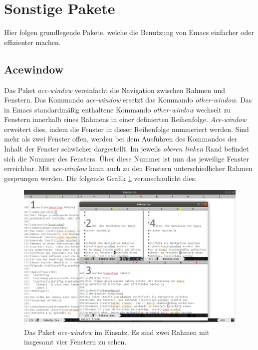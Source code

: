 \section{Sonstige Pakete}
\label{sec:misc}
Hier folgen grundlegende Pakete, welche die Benutzung von Emacs
einfacher oder effizienter machen.\\

\subsection{Acewindow}
\label{subsec:acewindow}
Das Paket \textit{ace-window} vereinfacht die Navigation zwischen
Rahmen und Fenstern. Das Kommando \textit{ace-window} ersetzt das
Kommando \textit{other-window}. Das in Emacs standardmäßig enthaltene
Kommando \textit{other-window} wechselt zu Fenstern innerhalb eines
Rahmens in einer definierten Reihenfolge. \textit{Ace-window}
erweitert dies, indem die Fenster in dieser Reihenfolge nummeriert
werden. Sind mehr als zwei Fenster offen, werden bei dem Ausführen des
Kommandos der Inhalt der Fenster {\glqq}schwächer{\grqq}
dargestellt. Im jeweils \textit{oberen linken} Rand befindet sich die
Nummer des Fensters. Über diese Nummer ist nun das jeweilige Fenster
erreichbar. Mit \textit{ace-window} kann auch zu den Fenstern
unterschiedlicher Rahmen gesprungen werden. Die folgende Grafik
\ref{fig:acewindow} veranschaulicht dies. \cite{AceWindow}

\begin{figure}[h]
  \centering
  \includegraphics[width=.95\textwidth]{./images/Pakete/acewindow.png}
  \caption{\label{fig:acewindow} Das Paket \textit{ace-window} im
    Einsatz. Es sind zwei Rahmen mit insgesamt vier Fenstern zu
    sehen.}
\end{figure}

